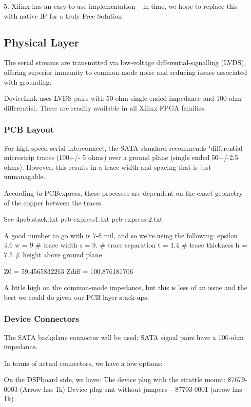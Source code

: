 5. Xilinx has an easy-to-use implementation -- in time, we hope to
   replace this with native IP for a truly Free Solution

\subsection{Physical Layer}
The serial streams are transmitted via low-voltage
differential-signalling (LVDS), offering superior immunity to
common-mode noise and reducing issues associated with grounding. 

DeviceLink uses LVDS pairs with 50-ohm single-ended impedance and
100-ohm differential. These are readily available in all Xilinx FPGA
families.

\subsubsection{PCB Layout} 
For high-speed serial interconnect, the SATA standard recommends "differential microstrip traces (100+/- 5 ohms) over a ground plane (single ended 50+/-2.5 ohms). However, this results in a trace width and spacing that is just unmanagable. 

According to PCBexpress, these processes are dependent on the exact
geometry of the copper between the traces.

See 4pcb.stack.txt
    pcb-express1.txt
    pcb-express-2.txt

A good number to go with is 7-8 mil, and so we're using the following:
epsilon = 4.6
w = 9 # trace width 
s = 9. # trace separation 
t = 1.4 # trace thickness 
h = 7.5 # height above ground plane

Z0 =  59.4565832263
Zdiff =  100.876181706

A little high on the common-mode impedance, but this is less of an issue and the best we could do given our PCB layer stack-ups. 



\subsubsection{Device Connectors}

The SATA backplane connector will be used; SATA signal pairs have a
100-ohm impedance.

In terms of actual connectors, we have a few options: 

On the DSPboard side, we have: 
  The device plug with the strattle mount: 87679-0003 (Arrow has 1k)
  Device plug smt without jumpers -- 87703-0001 (arrow has 1k)


